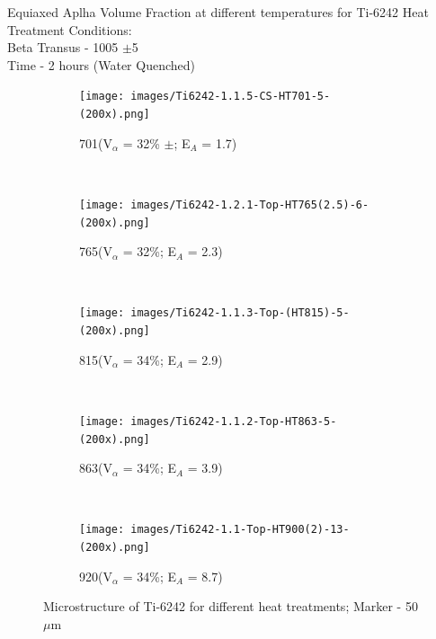 \documentclass[10pt]{beamer}
\begin{document}

\begin{frame}{Equiaxed Aplha Volume Fraction at different temperatures for Ti-6242}
Heat Treatment Conditions:\\
Beta Transus - 1005 $\pm$5 \degC \\
Time         - 2 hours (Water Quenched)


\begin{figure}[H]
    \centering
    \begin{subfigure}{0.25\textwidth}
        \texttt{[image: images/Ti6242-1.1.5-CS-HT701-5-(200x).png]}
        \caption{701\degC (V$_{\alpha}$ = 32\% $\pm$; E$_{A}$ = 1.7)}
        \label{fig:Ti-6242 HT700}
    \end{subfigure}    
    ~
    \begin{subfigure}{0.25\textwidth}
        \texttt{[image: images/Ti6242-1.2.1-Top-HT765(2.5)-6-(200x).png]}
        \caption{765\degC (V$_{\alpha}$ = 32\%; E$_{A}$ = 2.3)}
        \label{fig:Ti-6242 HT752}
    \end{subfigure}   
   \\
    \begin{subfigure}{0.25\textwidth}
        \texttt{[image: images/Ti6242-1.1.3-Top-(HT815)-5-(200x).png]}
        \caption{815\degC (V$_{\alpha}$ = 34\%; E$_{A}$ = 2.9)}
        \label{fig:Ti-6242 HT815}
    \end{subfigure}
    ~
    \begin{subfigure}{0.25\textwidth}
        \texttt{[image: images/Ti6242-1.1.2-Top-HT863-5-(200x).png]}
        \caption{863\degC (V$_{\alpha}$ = 34\%; E$_{A}$ = 3.9)}
        \label{fig:Ti-6242 HT863}
    \end{subfigure}
    ~
    \begin{subfigure}{0.25\textwidth}
        \texttt{[image: images/Ti6242-1.1-Top-HT900(2)-13-(200x).png]}
        \caption{920\degC (V$_{\alpha}$ = 34\%; E$_{A}$ = 8.7)}
        \label{fig:Ti-6242 HT920}
    \end{subfigure}        
   
    \caption{Microstructure of Ti-6242 for different heat treatments; Marker - 50$\mu$m}
    
\end{figure}
\end{frame}

\end{document}
